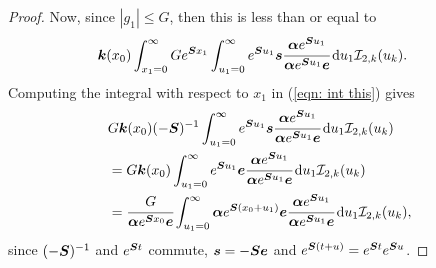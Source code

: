 \begin{proof}
	Now, since \(|g_1|\leq G\), then this is less than or equal to
	\begin{align}
		&\boldsymbol k(x_0) \int_{x_1=0}^\infty G  e^{\boldsymbol{S}x_1} \int_{u_1=0}^\infty e^{\boldsymbol{S}u_1}\boldsymbol s \cfrac{\boldsymbol \alpha e^{\boldsymbol{S}u_1}}{\boldsymbol \alpha e^{\boldsymbol{S}u_1}\boldsymbol e}\, \mathrm{d} u_1 \mathcal I_{2,k}(u_k).\label{eqn: int this}
	\end{align}
	Computing the integral with respect to \(x_1\) in (\ref{eqn: int this}) gives 
	\begin{align}
		 &G  \boldsymbol k(x_0)(-\boldsymbol{S})^{-1} \int_{u_1=0}^\infty e^{\boldsymbol{S}u_1}\boldsymbol s \cfrac{\boldsymbol \alpha e^{\boldsymbol{S}u_1}}{\boldsymbol \alpha e^{\boldsymbol{S}u_1}\boldsymbol e}\, \mathrm{d} u_1 \mathcal I_{2,k}(u_k) \nonumber 
		\\&= G \boldsymbol k(x_0)\int_{u_1=0}^\infty e^{\boldsymbol{S}u_1}\boldsymbol e \cfrac{\boldsymbol \alpha e^{\boldsymbol{S}u_1}}{\boldsymbol \alpha e^{\boldsymbol{S}u_1}\boldsymbol e}\, \mathrm{d} u_1\mathcal I_{2,k}(u_k) \nonumber 
		\\&=  \cfrac{G}{\boldsymbol \alpha e^{\boldsymbol{S}x_0}\boldsymbol e} \int_{u_1=0}^\infty \boldsymbol \alpha e^{\boldsymbol{S}(x_0+u_1)}\boldsymbol e \cfrac{\boldsymbol \alpha e^{\boldsymbol{S}u_1}}{\boldsymbol \alpha e^{\boldsymbol{S}u_1}\boldsymbol e}\, \mathrm{d} u_1\mathcal I_{2,k}(u_k), \label{eqn: yet another label}
	\end{align}
	since \((-\boldsymbol{S})^{-1}\) and \(e^{\boldsymbol{S}t}\) commute, \(\boldsymbol s = - \boldsymbol{S} \boldsymbol e \) and \(e^{\boldsymbol{S}(t+u)} = e^{\boldsymbol{S}t}e^{\boldsymbol{S}u}\). 
	

\end{proof}

